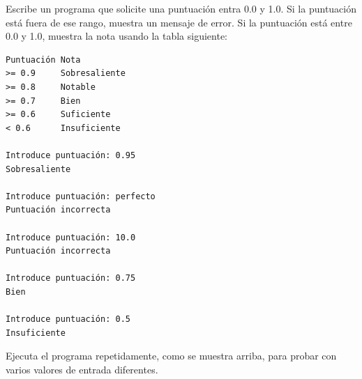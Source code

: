 \begin{ex}
Escribe un programa que solicite una puntuación entra 0.0 y 1.0.
Si la puntuación está fuera de ese rango, muestra un mensaje de error.
Si la puntuación está entre 0.0 y 1.0, muestra la nota usando la tabla
siguiente:

\begin{verbatim}
Puntuación Nota
>= 0.9     Sobresaliente
>= 0.8     Notable
>= 0.7     Bien
>= 0.6     Suficiente
< 0.6      Insuficiente

Introduce puntuación: 0.95
Sobresaliente

Introduce puntuación: perfecto
Puntuación incorrecta

Introduce puntuación: 10.0
Puntuación incorrecta

Introduce puntuación: 0.75
Bien

Introduce puntuación: 0.5
Insuficiente
\end{verbatim}

Ejecuta el programa repetidamente, como se muestra arriba, para probar
con varios valores de entrada diferentes.
\end{ex}

